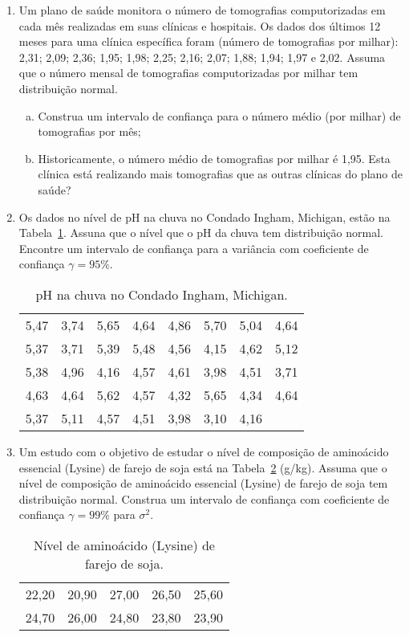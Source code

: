 \documentclass[12pt, a4paper]{article}
\begin{document}
\begin{enumerate}
	\item Um plano de saúde monitora o número de tomografias computorizadas em cada mês realizadas em suas clínicas e hospitais. Os dados dos últimos 12 meses para uma clínica específica foram (número de tomografias por milhar): 2,31; 2,09; 2,36; 1,95; 1,98; 2,25; 2,16; 2,07; 1,88; 1,94; 1,97 e 2,02. Assuma que o número mensal de tomografias  computorizadas por milhar tem distribuição normal.
	\begin{enumerate}[(a)]
		\item Construa um intervalo de confiança para o número médio (por milhar) de tomografias por mês;
		\item Historicamente, o número médio de tomografias por milhar é 1,95. Esta clínica está realizando mais tomografias que as outras clínicas do plano de saúde?
	\end{enumerate}
	
	\item Os dados no nível de pH na chuva no Condado Ingham, Michigan, estão na Tabela~\ref{tab:ph-ingham}. Assuna que o nível que o pH da chuva tem distribuição normal. Encontre um intervalo de confiança para a variância com coeficiente de confiança $\gamma=95\%$.
	\begin{table}[ht]
		\centering
		\begin{tabular}{cccccccc}
			\toprule
			5,47 & 3,74 & 5,65 & 4,64 & 4,86 & 5,70 & 5,04 & 4,64 \\ 
			5,37 & 3,71 & 5,39 & 5,48 & 4,56 & 4,15 & 4,62 & 5,12 \\ 
			5,38 & 4,96 & 4,16 & 4,57 & 4,61 & 3,98 & 4,51 & 3,71 \\ 
			4,63 & 4,64 & 5,62 & 4,57 & 4,32 & 5,65 & 4,34 & 4,64 \\ 
			5,37 & 5,11 & 4,57 & 4,51 & 3,98 & 3,10 & 4,16 &  \\ 
			\bottomrule
		\end{tabular}
		\caption{pH na chuva no Condado Ingham, Michigan.} 
		\label{tab:ph-ingham}
	\end{table}

	\item Um estudo com o objetivo de estudar o nível de composição de aminoácido essencial (Lysine) de farejo de soja está na Tabela~\ref{tab:lysine-farelo-soja} (g/kg). Assuma que o nível de composição de aminoácido essencial (Lysine) de farejo de soja tem distribuição normal. Construa um intervalo de confiança com coeficiente de confiança $\gamma=99\%$ para $\sigma^2$.
	\begin{table}[ht]
		\centering
		\begin{tabular}{ccccc}
			\toprule
			22,20 & 20,90 & 27,00 & 26,50 & 25,60 \\ 
			24,70 & 26,00 & 24,80 & 23,80 & 23,90 \\ 
			\bottomrule
		\end{tabular}
		\caption{Nível de aminoácido (Lysine) de farejo de soja.} 
		\label{tab:lysine-farelo-soja}
	\end{table}
	

\end{enumerate}
\end{document}
